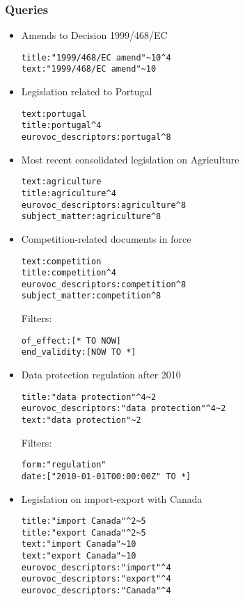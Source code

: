 \documentclass[table]{beamer}
\def\\{}
\begin{document}
\begin{frame}[fragile]
\frametitle{Queries}

\begin{minipage}[t]{0.49\textwidth}
\tiny
\begin{itemize}
    \itemsep0em
    \item Amends to Decision 1999/468/EC \begin{verbatim}
title:"1999/468/EC amend"~10^4
text:"1999/468/EC amend"~10
\end{verbatim}

    \item Legislation related to Portugal \begin{verbatim}
text:portugal
title:portugal^4
eurovoc_descriptors:portugal^8
\end{verbatim}

    \item Most recent consolidated legislation on Agriculture \begin{verbatim}
text:agriculture
title:agriculture^4
eurovoc_descriptors:agriculture^8
subject_matter:agriculture^8
\end{verbatim}

    \item Competition-related documents in force \begin{verbatim}
text:competition
title:competition^4
eurovoc_descriptors:competition^8
subject_matter:competition^8
\end{verbatim} \\
    Filters: \begin{verbatim}
of_effect:[* TO NOW]
end_validity:[NOW TO *]
\end{verbatim}
\end{itemize}
\end{minipage} %
\begin{minipage}[t]{0.49\textwidth}
\tiny
\begin{itemize}
    \itemsep0em
    \item Data protection regulation after 2010 \begin{verbatim}
title:"data protection"^4~2
eurovoc_descriptors:"data protection"^4~2
text:"data protection"~2
\end{verbatim} \\
    Filters: \begin{verbatim}
form:"regulation"
date:["2010-01-01T00:00:00Z" TO *]
\end{verbatim}
    
    \item Legislation on import-export with Canada \begin{verbatim}
title:"import Canada"^2~5
title:"export Canada"^2~5
text:"import Canada"~10
text:"export Canada"~10
eurovoc_descriptors:"import"^4
eurovoc_descriptors:"export"^4
eurovoc_descriptors:"Canada"^4
\end{verbatim} 


\end{itemize}
\end{minipage}
\end{frame}
\end{document}
